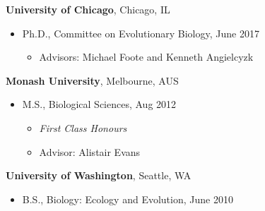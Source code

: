 \documentclass[10pt]{article}
\renewcommand{\section}[1]{\pagebreak[3]%
    \hyphenpenalty=10000%
    \vspace{1.3\baselineskip}%
    \phantomsection\addcontentsline{toc}{section}{#1}%
    \noindent\llap{\scshape\smash{\parbox[t]{\marginparwidth}{\raggedright #1}}}%
    \vspace{-\baselineskip}\par}
\newenvironment{outerlist}[1][\enskip\textbullet]%
        {\begin{itemize}[#1,leftmargin=*]}{\end{itemize}%
            \vspace{-.6\baselineskip}}
\newenvironment{innerlist}[1][\enskip\textbullet]%
        {\begin{itemize}[#1,leftmargin=*,parsep=0pt,itemsep=0pt,topsep=0pt,partopsep=0pt]}
        {\end{itemize}}
\begin{document}
\textbf{University of Chicago}, Chicago, IL
\begin{outerlist}
\item[] Ph.D., Committee on Evolutionary Biology, June 2017
  \begin{innerlist}
  \item Advisors: Michael Foote and Kenneth Angielcyzk
  \end{innerlist}
\end{outerlist}
\vspace{.1in}
\textbf{Monash University}, Melbourne, AUS 
\begin{outerlist}
\item[] M.S., Biological Sciences, Aug 2012
  \begin{innerlist}
  \item \emph{First Class Honours}
  \item Advisor: Alistair Evans
  \end{innerlist}
\end{outerlist}
\vspace{.1in}
\textbf{University of Washington}, Seattle, WA
\begin{outerlist}
\item[] B.S., Biology: Ecology and Evolution, June 2010
\end{outerlist}

%
%
%
%
\end{document}
